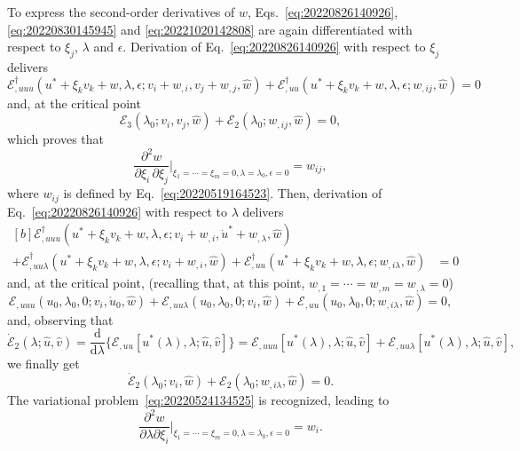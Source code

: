 \documentclass[12pt, final]{scrartcl}
\theoremstyle{definition}
\newcommand{\E}{\mathcal E}
\newcommand{\EE}{\mathcal E ^ \dagger}
\newcommand{\D}{\mathrm{d}}
\begin{document}
To express the second-order derivatives of $w$, Eqs.~\eqref{eq:20220826140926}, \eqref{eq:20220830145945} and
\eqref{eq:20221020142808} are again differentiated with respect to $\xi_j$, $\lambda$ and \(\epsilon\). Derivation of
Eq.~\eqref{eq:20220826140926} with respect to \(\xi_j\) delivers
\begin{equation}
  \EE_{,uuu}(u^\ast + \xi_k v_k + w, \lambda, \epsilon; v_i + w_{,i}, v_j + w_{,j}, \hat{w}) + \EE_{,uu}(u^\ast + \xi_k v_k + w, \lambda, \epsilon; w_{,ij}, \hat{w}) = 0
\end{equation}
and, at the critical point
\begin{equation}
  \E_3(\lambda_0; v_i, v_j, \hat{w}) + \E_2(\lambda_0; w_{,ij}, \hat{w}) = 0,
\end{equation}
which proves that
\begin{equation}
  \frac{\partial^2 w}{\partial\xi_i \, \partial\xi_j} \biggr\rvert_{\xi_1 = \cdots = \xi_m = 0, \lambda = \lambda_0, \epsilon = 0} = w_{ij},
\end{equation}
where \(w_{ij}\) is defined by Eq.~\eqref{eq:20220519164523}. Then, derivation of Eq.~\eqref{eq:20220826140926} with
respect to \(\lambda\) delivers
\begin{equation}
  \begin{aligned}[b]
    \EE_{,uuu}(u^\ast + \xi_k v_k + w, \lambda, \epsilon; v_i + w_{,i}, \dot{u}^\ast + w_{,\lambda}, \hat{w}) &\\
    + \EE_{,uu\lambda}(u^\ast + \xi_k v_k + w, \lambda, \epsilon; v_i + w_{,i}, \hat{w}) + \EE_{,uu}(u^\ast + \xi_k v_k + w, \lambda, \epsilon; w_{,i\lambda}, \hat{w}) &= 0
  \end{aligned}
\end{equation}
and, at the critical point, (recalling that, at this point, $w_{,1} = \cdots = w_{, m} = w_{, \lambda} = 0$)
\begin{equation}
  \E_{,uuu}(u_0, \lambda_0, 0; v_i, \mathring{u}_0, \hat{w}) + \E_{,uu\lambda}(u_0, \lambda_0, 0; v_i, \hat{w}) + \E_{,uu}(u_0, \lambda_0, 0; w_{,i\lambda}, \hat{w}) = 0,
\end{equation}
and, observing that
\begin{equation}
  \dot{\E}_2(\lambda; \hat{u}, \hat{v}) = \frac{\D}{\D \lambda} \bigl\{ \E_{,uu}[u^\ast(\lambda), \lambda; \hat{u}, \hat{v}]\bigr\}
  = \E_{,uuu}[u^\ast(\lambda), \lambda; \hat{u}, \hat{v}] + \E_{,uu\lambda}[u^\ast(\lambda), \lambda; \hat{u}, \hat{v}],
\end{equation}
we finally get
\begin{equation}
  \dot{\E}_2(\lambda_0; v_i, \hat{w}) + \E_2(\lambda_0; w_{,i\lambda}, \hat{w}) = 0.
\end{equation}
The variational problem~\eqref{eq:20220524134525} is recognized, leading to
\begin{equation}
  \frac{\partial^2w}{\partial\lambda \partial\xi_i}\biggr\rvert_{\xi_1 = \cdots = \xi_m = 0, \lambda = \lambda_0, \epsilon = 0} = w_{i}.
\end{equation}
\end{document}
